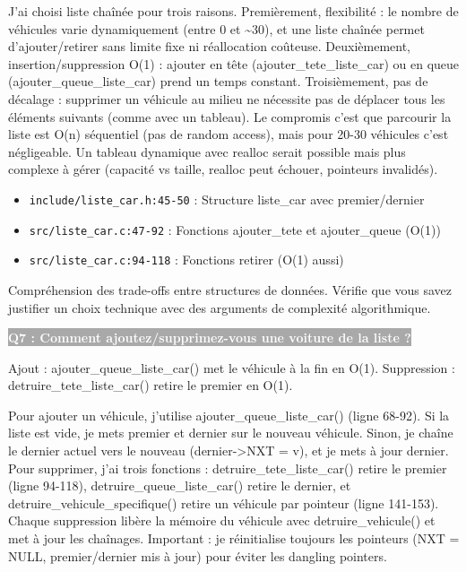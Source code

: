 \documentclass[12pt,a4paper]{article}
\newcommand{\question}[1]{%
    \vspace{0.5cm}
    \noindent\colorbox{darkgray}{\textcolor{white}{\textbf{#1}}}
    \vspace{0.3cm}
}
\begin{document}
\begin{reponse_longue}
J'ai choisi liste chaînée pour trois raisons. Premièrement, flexibilité : le nombre de véhicules varie dynamiquement (entre 0 et \textasciitilde{}30), et une liste chaînée permet d'ajouter/retirer sans limite fixe ni réallocation coûteuse. Deuxièmement, insertion/suppression O(1) : ajouter en tête (ajouter\_tete\_liste\_car) ou en queue (ajouter\_queue\_liste\_car) prend un temps constant. Troisièmement, pas de décalage : supprimer un véhicule au milieu ne nécessite pas de déplacer tous les éléments suivants (comme avec un tableau). Le compromis c'est que parcourir la liste est O(n) séquentiel (pas de random access), mais pour 20-30 véhicules c'est négligeable. Un tableau dynamique avec realloc serait possible mais plus complexe à gérer (capacité vs taille, realloc peut échouer, pointeurs invalidés).
\end{reponse_longue}

\begin{reference_code}
\begin{itemize}
    \item \texttt{include/liste\_car.h:45-50} : Structure liste\_car avec premier/dernier
    \item \texttt{src/liste\_car.c:47-92} : Fonctions ajouter\_tete et ajouter\_queue (O(1))
    \item \texttt{src/liste\_car.c:94-118} : Fonctions retirer (O(1) aussi)
\end{itemize}
\end{reference_code}

\begin{objectif_prof}
Compréhension des trade-offs entre structures de données. Vérifie que vous savez justifier un choix technique avec des arguments de complexité algorithmique.
\end{objectif_prof}

\question{Q7 : Comment ajoutez/supprimez-vous une voiture de la liste ?}

\begin{reponse_courte}
Ajout : ajouter\_queue\_liste\_car() met le véhicule à la fin en O(1). Suppression : detruire\_tete\_liste\_car() retire le premier en O(1).
\end{reponse_courte}

\begin{reponse_longue}
Pour ajouter un véhicule, j'utilise ajouter\_queue\_liste\_car() (ligne 68-92). Si la liste est vide, je mets premier et dernier sur le nouveau véhicule. Sinon, je chaîne le dernier actuel vers le nouveau (dernier->NXT = v), et je mets à jour dernier. Pour supprimer, j'ai trois fonctions : detruire\_tete\_liste\_car() retire le premier (ligne 94-118), detruire\_queue\_liste\_car() retire le dernier, et detruire\_vehicule\_specifique() retire un véhicule par pointeur (ligne 141-153). Chaque suppression libère la mémoire du véhicule avec detruire\_vehicule() et met à jour les chaînages. Important : je réinitialise toujours les pointeurs (NXT = NULL, premier/dernier mis à jour) pour éviter les dangling pointers.
\end{reponse_longue}
\end{document}
